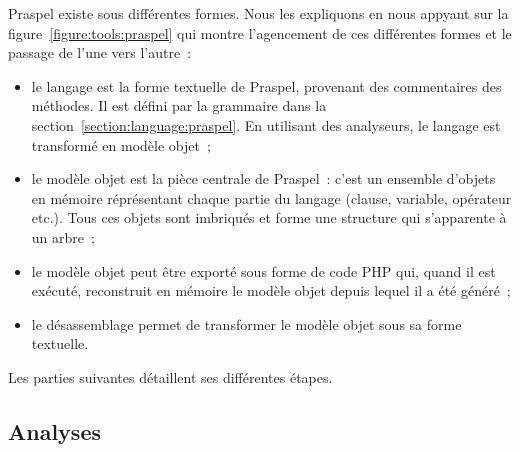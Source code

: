 Praspel existe sous différentes formes. Nous les expliquons en nous appyant sur
la figure~\ref{figure:tools:praspel} qui montre l'agencement de ces différentes
formes et le passage de l'une vers l'autre~:
%
\begin{itemize}

\item le langage est la forme textuelle de Praspel, provenant des commentaires
des méthodes. Il est défini par la grammaire dans la
section~\ref{section:language:praspel}. En utilisant des analyseurs, le langage
est transformé en modèle objet~;

\item le modèle objet est la pièce centrale de Praspel~: c'est un ensemble
d'objets en mémoire réprésentant chaque partie du langage (clause, variable,
opérateur etc.). Tous ces objets sont imbriqués et forme une structure qui
s'apparente à un arbre~;

\item le modèle objet peut être exporté sous forme de code PHP qui, quand il est
exécuté, reconstruit en mémoire le modèle objet depuis lequel il a été généré~;

\item le désassemblage permet de transformer le modèle objet sous sa forme
textuelle.

\end{itemize}
%
Les parties suivantes détaillent ses différentes étapes.

\subsection{Analyses}
\label{subsection:tools:interpretation}

